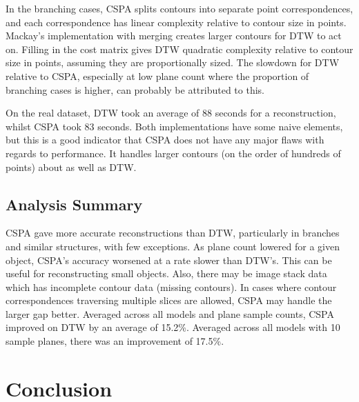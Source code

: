 \documentclass[11p, titlepage]{article}
\begin{document}
In the branching cases, CSPA splits contours into separate point correspondences, and each correspondence has linear complexity relative to contour size in points. Mackay's implementation with merging creates larger contours for DTW to act on. Filling in the cost matrix gives DTW quadratic complexity relative to contour size in points, assuming they are proportionally sized. The slowdown for DTW relative to CSPA, especially at low plane count where the proportion of branching cases is higher, can probably be attributed to this.

On the real dataset, DTW took an average of 88 seconds for a reconstruction, whilst CSPA took 83 seconds. Both implementations have some naive elements, but this is a good indicator that CSPA does not have any major flaws with regards to performance. It handles larger contours (on the order of hundreds of points) about as well as DTW.

\subsection{Analysis Summary}

CSPA gave more accurate reconstructions than DTW, particularly in branches and similar structures, with few exceptions. As plane count lowered for a given object, CSPA's accuracy worsened at a rate slower than DTW's. This can be useful for reconstructing small objects. Also, there may be image stack data which has incomplete contour data (missing contours). In cases where contour correspondences traversing multiple slices are allowed, CSPA may handle the larger gap better. Averaged across all models and plane sample counts, CSPA improved on DTW by an average of 15.2\%. Averaged across all models with 10 sample planes, there was an improvement of 17.5\%.
\pagebreak

\section{Conclusion}
\end{document}
